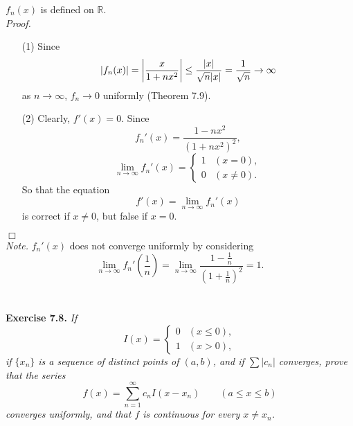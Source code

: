 \documentclass{article}
\begin{document}
$f_n(x)$ is defined on $\mathbb{R}$. \\

\emph{Proof.}
\begin{enumerate}
  \item[(1)]
  Since
  \[
    \abs{ f_n(x) }
    = \abs{ \frac{x}{1+nx^2} }
    \leq \frac{|x|}{\sqrt{n}|x|}
    = \frac{1}{\sqrt{n}} \to \infty
  \]
  as $n \to \infty$, $f_n \to 0$ uniformly (Theorem 7.9).

  \item[(2)]
  Clearly, $f'(x) = 0$.
  Since
  \[
    f_n'(x) = \frac{1-nx^2}{(1+nx^2)^2},
  \]
  \begin{equation*}
  \lim_{n \to \infty} f_n'(x) =
    \begin{cases}
      1 & (x = 0), \\
      0 & (x \neq 0).
    \end{cases}
  \end{equation*}
  So that the equation
  \[
    f'(x) = \lim_{n \to \infty} f_n'(x)
  \]
  is correct if $x \neq 0$, but false if $x = 0$.
\end{enumerate}
$\Box$ \\

\emph{Note.}
$f_n'(x)$ does not converge uniformly by considering
\[
  \lim_{n \to \infty} f_n'\left(\frac{1}{n}\right)
  = \lim_{n \to \infty} \frac{1-\frac{1}{n}}{(1+\frac{1}{n})^2}
  = 1.
\]
\\\\






\textbf{Exercise 7.8.}
\emph{If
  \begin{equation*}
  I(x) =
    \begin{cases}
      0 & (x \leq 0), \\
      1 & (x > 0),
    \end{cases}
  \end{equation*}
if $\{ x_n \}$ is a sequence of distinct points of $(a,b)$,
and if $\sum|c_n|$ converges,
prove that the series
\[
  f(x) = \sum_{n=1}^{\infty} c_n I(x-x_n)
  \qquad
  (a \leq x \leq b)
\]
converges uniformly,
and that $f$ is continuous for every $x \neq x_n$.} \\
\end{document}
